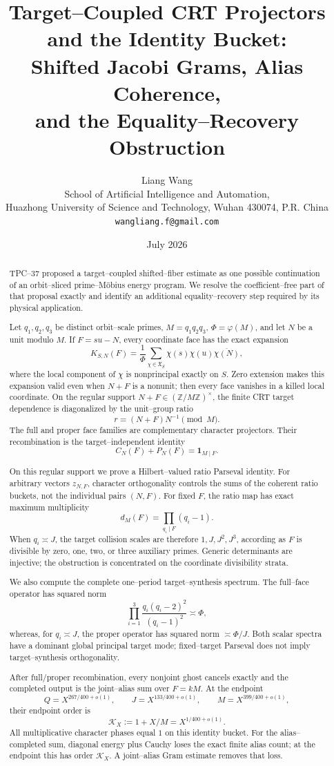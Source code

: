 \documentclass[11pt]{article}
\title{\textbf{Target--Coupled CRT Projectors and the Identity Bucket:}\\
\textbf{Shifted Jacobi Grams, Alias Coherence,}\\
\textbf{and the Equality--Recovery Obstruction}}
\author{Liang Wang\\
\small School of Artificial Intelligence and Automation,\\[-0.2em]
\small Huazhong University of Science and Technology, Wuhan 430074, P.R. China\\
\small \texttt{wangliang.f@gmail.com}}
\date{July 2026}
\theoremstyle{definition}
\theoremstyle{remark}
\newcommand{\Z}{\mathbb Z}
\newcommand{\one}{\mathbf 1}
\newcommand{\cK}{\mathcal K}
\begin{document}
\maketitle

\begin{abstract}
TPC--37 proposed a target--coupled shifted--fiber estimate as one possible
continuation of an orbit--sliced prime--M\"obius energy program.  We resolve
the coefficient--free part of that proposal exactly and identify an
additional equality--recovery step required by its physical application.

Let \(q_1,q_2,q_3\) be distinct orbit--scale primes,
\(M=q_1q_2q_3\), \(\Phi=\varphi(M)\), and let \(N\) be a unit modulo
\(M\).  If \(F=su-N\), every coordinate face has the exact expansion
\[
 K_{S,N}(F)=\frac1\Phi
 \sum_{\chi\in\mathfrak X_S}
 \chi(s)\chi(u)\overline{\chi(N)},
\]
where the local component of \(\chi\) is nonprincipal exactly on \(S\).
Zero extension makes this expansion valid even when \(N+F\) is a nonunit;
then every face vanishes in a killed local coordinate.  On the regular
support \(N+F\in(\Z/M\Z)^\times\), the finite CRT target dependence is
diagonalized by the unit--group ratio
\[
 r=(N+F)N^{-1}\pmod M.
\]
The full and proper face families are complementary character
projectors.  Their recombination is the target--independent identity
\[
 C_N(F)+P_N(F)=\one_{M\mid F}.
\]

On this regular support we prove a Hilbert--valued ratio Parseval identity.  For arbitrary vectors
\(z_{N,F}\), character orthogonality controls the sums of the coherent
ratio buckets, not the individual pairs \((N,F)\).  For fixed \(F\), the
ratio map has exact maximum multiplicity
\[
 d_M(F)=\prod_{q_i\mid F}(q_i-1).
\]
When \(q_i\asymp J\), the target collision scales are therefore
\(1,J,J^2,J^3\), according as \(F\) is divisible by zero, one, two, or
three auxiliary primes.  Generic
determinants are injective; the obstruction is concentrated on the
coordinate divisibility strata.

We also compute the complete one--period target--synthesis spectrum.  The
full--face operator has squared norm
\[
 \prod_{i=1}^3\frac{q_i(q_i-2)^2}{(q_i-1)^2}\asymp\Phi,
\]
whereas, for \(q_i\asymp J\), the proper operator has squared norm
\(\asymp\Phi/J\).  Both scalar spectra have a dominant global principal
target mode; fixed--target Parseval does not imply target--synthesis
orthogonality.

After full/proper recombination, every nonjoint ghost cancels exactly and
the completed output is the joint--alias sum over \(F=kM\).  At the endpoint
\[
 Q=X^{267/400+o(1)},\qquad J=X^{133/400+o(1)},\qquad
 M=X^{399/400+o(1)},
\]
their endpoint order is
\[
 \cK_X:=1+X/M=X^{1/400+o(1)}.
\]
All multiplicative character phases equal \(1\) on this identity bucket.
For the alias--completed sum, diagonal energy plus Cauchy loses the exact
finite alias count; at the endpoint this has order \(\cK_X\).  A
joint--alias Gram estimate removes that loss.


\end{abstract}
\end{document}
